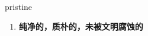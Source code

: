 
\begin{frame}
{\huge pristine}
\begin{center}
\begin{enumerate}\Large
  \item \textbf{纯净的，质朴的，未被文明腐蚀的}
\end{enumerate}
\end{center}
\end{frame}
